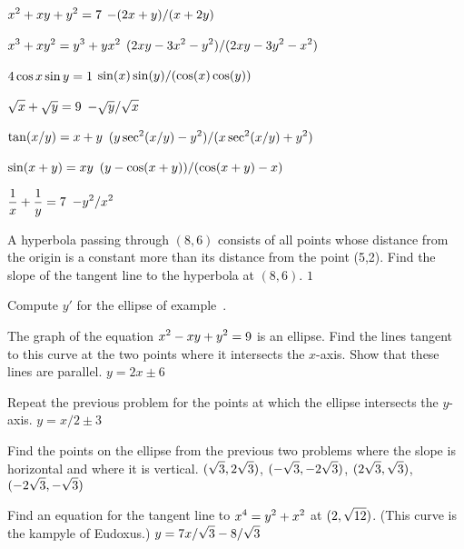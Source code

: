 \exercise $\displaystyle x^2+xy+y^2=7$
\answer $\displaystyle -(2x+y)/(x+2y)$
\endanswer
\endexercise

\exercise $\displaystyle x^3+xy^2=y^3+yx^2$
\answer $\displaystyle (2xy-3x^2-y^2)/(2xy-3y^2-x^2)$
\endanswer
\endexercise

\exercise  $\displaystyle 4\cos x \sin y = 1$
\answer $\displaystyle \sin(x)\sin(y)/(\cos(x)\cos(y))$
\endanswer
\endexercise

\exercise $\displaystyle\sqrt{x} + \sqrt{y} = 9$
\answer $\displaystyle-\sqrt{y}/\sqrt{x}$
\endanswer
\endexercise

\exercise $\displaystyle \tan(x/y) = x+ y$
 \answer $\displaystyle (y\sec^2(x/y)-y^2)/(x\sec^2(x/y)+y^2)$
\endanswer
\endexercise

\exercise $\displaystyle \sin (x+y ) =xy$
 \answer $\displaystyle (y-\cos(x+y))/(\cos(x+y)-x)$
\endanswer
\endexercise

\exercise $\displaystyle{1\over x} + {1\over y} = 7$
\answer $\displaystyle -y^2/x^2$
\endanswer
\endexercise

\exercise
A hyperbola passing through $(8,6)$ consists of all points whose distance
from the origin is a constant more than its distance from the point (5,2).
Find the slope of the tangent line to the hyperbola at $(8,6)$.
\answer $1$
\endanswer
\endexercise

\exercise
Compute $y'$ for the ellipse of example~.
\endexercise

\exercise The graph of the equation $\displaystyle x^2 - xy + y^2 = 9$ is an ellipse.
Find the lines tangent to this curve at the two
 points where it intersects the $x$-axis. Show that these lines are
 parallel.
\answer $y=2x\pm6$
\endanswer
\endexercise

\exercise Repeat the previous problem for the points at which the
 ellipse intersects the $y$-axis.
\answer $y=x/2\pm3$
\endanswer
\endexercise

\exercise Find the points on the ellipse from the previous two problems
 where the slope is horizontal and where it is vertical.
\answer $\displaystyle (\sqrt3,2\sqrt3)$, $\displaystyle (-\sqrt3,-2\sqrt3)$, $\displaystyle (2\sqrt3,\sqrt3)$,
$\displaystyle (-2\sqrt3,-\sqrt3)$ 
\endanswer
\endexercise

\exercise Find an equation for the tangent line to 
$\displaystyle x^4 = y^2 + x^2$ at $\displaystyle (2, \sqrt{12})$. 
(This curve is the {\dfont kampyle of Eudoxus}.)
\answer $\displaystyle y=7x/\sqrt3-8/\sqrt3$
\endanswer
\endexercise

